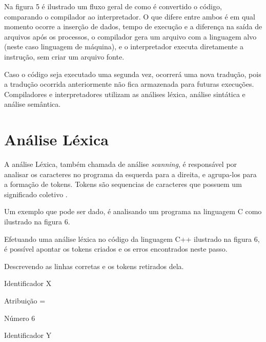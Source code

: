 \documentclass[12pt,oneside,a4paper,chapter=TITLE,section=TITLE,sumario=tradicional]{abntex2}
\begin{document}
Na figura 5 é ilustrado um fluxo geral de como é convertido o código, comparando o compilador ao interpretador. O que difere entre ambos é em qual momento ocorre a inserção de dados, tempo de execução e a diferença na saída de arquivos após os processos, o compilador gera um arquivo com a linguagem alvo (neste caso linguagem de máquina), e o interpretador executa diretamente a instrução, sem criar um arquivo fonte.

\begin{figure}[htb]
\end{figure}

Caso o código seja executado uma segunda vez, ocorrerá uma nova tradução, pois a tradução ocorrida anteriormente não fica armazenada para futuras execuções. Compiladores e interpretadores utilizam as análises léxica, análise sintática e análise semântica.

\section{Análise Léxica}
\label{sec:analise-lexica}

A análise Léxica, também chamada de análise \textit{scanning}, é responsável por analisar os caracteres no programa da esquerda para a direita, e agrupa-los para a formação de tokens. Tokens são sequencias de caracteres que possuem um significado coletivo \cite{alfred1995}.

Um exemplo que pode ser dado, é analisando um programa na linguagem C como ilustrado na figura 6.

\begin{figure}[htb]
\end{figure}

Efetuando uma análise léxica no código da linguagem C++ ilustrado na figura 6, é possível apontar os tokens criados e os erros encontrados neste passo. 

Descrevendo as linhas corretas e os tokens retirados dela.

\begin{lista}
	\item Identificador    X 
	\item Atribuição        = 
	\item Número            6 
	\item Identificador    Y
\end{lista}
\end{document}
